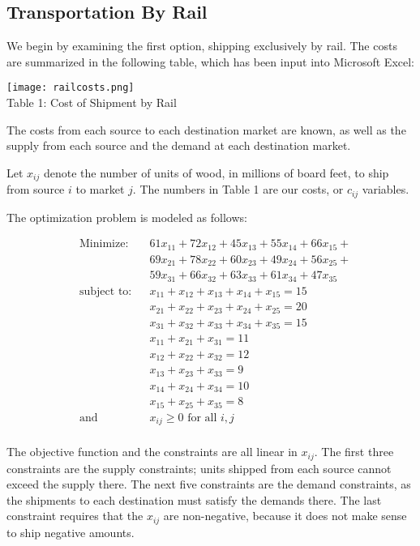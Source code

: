 \documentclass[12pt,letterpaper]{article}
\begin{document}
\subsection{Transportation By Rail}
We begin by examining the first option, shipping exclusively by rail.  The costs are summarized in the following table,
which has been input into Microsoft Excel:

\begin{center}
\texttt{[image: railcosts.png]}\\
Table 1: Cost of Shipment by Rail
\end{center}

The costs from each source to each destination market are known, as well as the supply from each source and the demand
at each destination market.

Let $x_{ij}$ denote the number of units of wood, in millions of board feet, to ship from source $i$ to market $j$.  The
numbers in Table 1 are our costs, or $c_{ij}$ variables.

The optimization problem is modeled as follows:

$$
\begin{aligned}
& \text{Minimize:}
& & 61x_{11} + 72x_{12} + 45x_{13} + 55x_{14} + 66x_{15} + \\
&&& 69x_{21} + 78x_{22} + 60x_{23} + 49x_{24} + 56x_{25} + \\
&&& 59x_{31} + 66x_{32} + 63x_{33} + 61x_{34} + 47x_{35} \\
& \text{subject to:}
& & x_{11} + x_{12} + x_{13} + x_{14} + x_{15} = 15 \\
&&& x_{21} + x_{22} + x_{23} + x_{24} + x_{25} = 20 \\
&&& x_{31} + x_{32} + x_{33} + x_{34} + x_{35} = 15 \\
&&& x_{11} + x_{21} + x_{31} = 11 \\
&&& x_{12} + x_{22} + x_{32} = 12 \\
&&& x_{13} + x_{23} + x_{33} = 9 \\
&&& x_{14} + x_{24} + x_{34} = 10 \\
&&& x_{15} + x_{25} + x_{35} = 8 \\
& \text{and}
& & x_{ij} \geq 0 \text{ for all } i, j \\
\end{aligned}
$$

The objective function and the constraints are all linear in $x_{ij}$. The first three constraints are the supply
constraints; units shipped from each source cannot exceed the supply there. The next five constraints are the demand
constraints, as the shipments to each destination must satisfy the demands there. The last constraint requires that the
$x_{ij}$ are non-negative, because it does not make sense to ship negative amounts.
\end{document}
